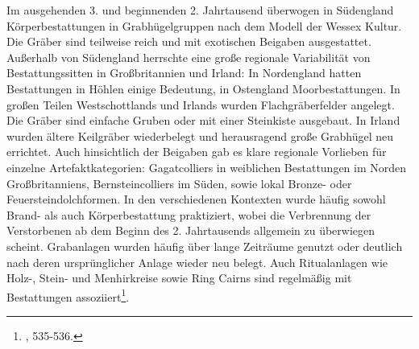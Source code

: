 \documentclass[openany,twoside,twocolumn]{book}
\let\rmarkdownfootnote\footnote%
\def\footnote{\protect\rmarkdownfootnote}
\begin{document}
Im ausgehenden 3. und beginnenden 2. Jahrtausend überwogen in Südengland
Körperbestattungen in Grabhügelgruppen nach dem Modell der Wessex
Kultur. Die Gräber sind teilweise reich und mit exotischen Beigaben
ausgestattet. Außerhalb von Südengland herrschte eine große regionale
Variabilität von Bestattungssitten in Großbritannien und Irland: In
Nordengland hatten Bestattungen in Höhlen einige Bedeutung, in
Ostengland Moorbestattungen. In großen Teilen Westschottlands und
Irlands wurden Flachgräberfelder angelegt. Die Gräber sind einfache
Gruben oder mit einer Steinkiste ausgebaut. In Irland wurden ältere
Keilgräber wiederbelegt und herausragend große Grabhügel neu errichtet.
Auch hinsichtlich der Beigaben gab es klare regionale Vorlieben für
einzelne Artefaktkategorien: Gagatcolliers in weiblichen Bestattungen im
Norden Großbritanniens, Bernsteincolliers im Süden, sowie lokal Bronze-
oder Feuersteindolchformen. In den verschiedenen Kontexten wurde häufig
sowohl Brand- als auch Körperbestattung praktiziert, wobei die
Verbrennung der Verstorbenen ab dem Beginn des 2. Jahrtausends allgemein
zu überwiegen scheint. Grabanlagen wurden häufig über lange Zeiträume
genutzt oder deutlich nach deren ursprünglicher Anlage wieder neu
belegt. Auch Ritualanlagen wie Holz-, Stein- und Menhirkreise sowie Ring
Cairns sind regelmäßig mit Bestattungen assoziiert\footnote{\textcite{roberts_britain_2013},
  535-536.}.
\end{document}
